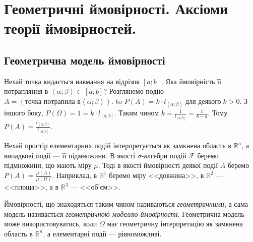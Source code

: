 
\newlength\Radius
\setlength\Radius{2cm}

\section{Геометричні ймовірності. Аксіоми теорії ймовірностей.}
\subsection{Геометрична модель ймовірності}
\begin{example}
    Нехай точка кидається навмання на відрізок $\left[a; b\right]$. 
    Яка ймовірність її 
    потрапляння в $\left<\alpha; \beta\right> \subset  \left[a; b\right]$?
    Розглянемо подію $A = \left\{ 
        \text{точка потрапила в} \left<\alpha; \beta\right>
    \right\}$.
    \newline
    \hbox to 
    $P(A) = k\cdot l_{\left<\alpha; \beta\right>}\; \text{для деякого}\; k > 0$.
    З іншого боку, $P(\Omega) = 1 = k\cdot l_{\left[a; b\right]}$. Таким чином 
    $k = \frac{1}{l_{\left[a; b\right]}} = \frac{1}{b-a}$.
    Тому $P(A) = \frac{l_{\left<\alpha; \beta\right>}}{l_{\left[a; b\right]}}$.
\end{example}
Нехай простір елементарних подій інтерпретується як замкнена область в 
$ \mathbb{R} ^n$, а випадкові події --- її підмножини. В якості $\sigma$-алгебри 
подій $\mathcal{F}$ беремо підмножини, що мають міру $\mu$. Тоді в якості ймовірності 
деякої події $A$ беремо $P(A) = \frac{\mu(A)}{\mu(\Omega)}$. 
Наприклад, в $\mathbb{R}^1$ беремо міру <<довжина>>, в $\mathbb{R}^2$ --- <<площа>>, а в $\mathbb{R}^3$ --- <<об'єм>>.

Ймовірності, що знаходяться таким чином називаються \emph{геометричними}, а сама модель 
називається \emph{геометричною моделлю ймовірності}.
Геометрична модель може використовуватись, 
коли $\Omega$ має геометричну інтерпретацію як замкнена область в $\mathbb{R}^n$,
а елементарні події --- рівноможливі.

